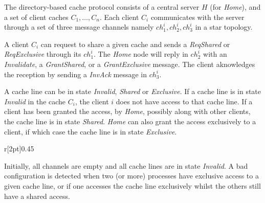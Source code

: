 The directory-based cache protocol consists of a central server $H$
(for \emph{Home}), and a set of client caches $C_1,\ldots,C_n$. Each
client $C_i$ communicates with the server through a set of three
message channels namely $ch_1^i,ch_2^i,ch_3^i$ in a star
topology.

A client $C_i$ can request to share a given cache and sends a
\emph{ReqShared} or \emph{ReqExclusive} through its $ch_1^i$. The
\emph{Home} node will reply in $ch_2^i$ with an \emph{Invalidate}, a
\emph{GrantShared}, or a \emph{GrantExclusive} message. The client
aknowledges the reception by sending a \emph{InvAck} message in
$ch_3^i$.

A cache line can be in state \emph{Invalid}, \emph{Shared} or
\emph{Exclusive}. If a cache line is in state \emph{Invalid} in the
cache $C_i$, the client $i$ does not have access to that cache line.
If a client has been granted the access, by \emph{Home}, possibly
along with other clients, the cache line is in state \emph{Shared}.
\emph{Home} can also grant the access exclusively to a client, if
which case the cache line is in state \emph{Exclusive}.

\begin{wrapfigure}{r}[2pt]{0.45\textwidth}
  \hfill
\end{wrapfigure}
%
Initially, all channels are empty and all cache lines are in state
\emph{Invalid}. A bad configuration is detected when two (or more)
processes have exclusive access to a given cache line, or if one
accesses the cache line exclusively whilst the others still have a
shared access.

